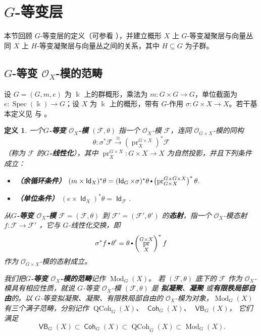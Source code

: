 \documentclass[11pt,a4paper]{article}
\renewcommand{\emph}[1]{{\bfseries #1}}
\DeclareMathOperator{\id}{\mathsf{Id}}
\DeclareMathOperator{\QCoh}{\mathrm{QCoh}}
\DeclareMathOperator{\Spec}{\mathrm{Spec}}
\DeclareMathOperator{\Mod}{\mathrm{Mod}}
\DeclareMathOperator{\Coh}{\mathsf{Coh}}
\DeclareMathOperator{\field}{\mathbb{k}}
\DeclareMathOperator{\VB}{\mathsf{VB}}
\DeclareMathOperator{\pr}{\operatorname{pr}}
\DeclareMathOperator{\comp}{\vcenter{\hbox{\scalebox{0.65}{$\bullet$}}}}
\theoremstyle{cnth}
\newtheorem{defn}[thm]{定义}
\begin{document}
\section{$G$-等变层\label{sec:G-equiv-sheaves}}
本节回顾 $G$-等变层的定义（可参看 \cite[\href{https://stacks.math.columbia.edu/tag/03LE}{Tag 03LE}]{stacks-project}），并建立概形 $X$ 上 $G$-等变凝聚层与向量丛同 $X$ 上 $H$-等变凝聚层与向量丛之间的关系，其中 $H\subseteq G$ 为子群。

\subsection{$G$-等变 $\mathcal{O}_X$-模的范畴}

设 $G=(G, m, e)$ 为 $\field$ 上的群概形，乘法为 $m : G \times G \rightarrow G$，单位截面为 $e : \Spec(\field) \rightarrow G$；设 $X$ 为 $\field$ 上的概形，带有 $G$-作用 $\sigma : G \times X \rightarrow X$。若干基本定义见 \cite[\href{https://stacks.math.columbia.edu/tag/022R}{Section 022R}]{stacks-project} 与 \cite[\href{https://stacks.math.columbia.edu/tag/01II}{Section 01II}]{stacks-project}。

\begin{defn}\label{defn:EquivariantSheaves}
一个\emph{$G$-等变 $\mathcal{O}_X$-模}
$(\mathcal{F}, \theta)$
指一个 $\mathcal{O}_X$-模 $\mathcal{F}$，连同 $\mathcal{O}_{G\times X}$-模的同构
$$
\theta : \sigma^* \mathcal{F} \xrightarrow{\cong} \left(\pr_X^{G \times X}\right)^* \mathcal{F}
$$
（称为 $\mathcal{F}$ 的\emph{$G$-线性化}），其中 $\pr_X^{G \times X} : G \times X \rightarrow X$ 为自然投影，并且下列条件成立：
\begin{itemize}
\item \emph{（余循环条件）}
$
(m \times \id_X)^* \theta
=
(\id_G \times \sigma)^* \theta \comp \left(\pr_{G \times X}^{G \times G \times X}\right)^* \theta.
$

\item \emph{（单位条件）}
$(e \times \id_X)^*\theta = \id_{\mathcal{F}}$.
\end{itemize}

从\emph{$G$-等变 $\mathcal{O}_X$-模}
$\mathcal{F}=(\mathcal{F}, \theta)$
到
$\mathcal{F}'=(\mathcal{F}', \theta')$
的\emph{态射}，指一个 $\mathcal{O}_X$-模态射
$
f : \mathcal{F} \rightarrow \mathcal{F}'
$
，它与 $G$-线性化交换，即
$$
\sigma^* f \comp \theta'
=
\theta \comp \left(\pr_X^{G \times X}\right)^* f
$$
作为 $\mathcal{O}_{G \times X}$-模的态射成立。

我们把\emph{$G$-等变 $\mathcal{O}_X$-模的范畴}记作
$\Mod_G(X)$。
若 $(\mathcal{F},\theta)$ 底下的 $\mathcal{F}$ 作为 $\mathcal{O}_X$-模具有相应性质，就说 $G$-等变 $\mathcal{O}_X$-模 $(\mathcal{F},\theta)$ 是
\emph{拟凝聚}、\emph{凝聚}
或\emph{有限秩局部自由}的。以 $G$-等变拟凝聚、凝聚、有限秩局部自由的 $\mathcal{O}_X$-模为对象，$\Mod_G(X)$ 有三个满子范畴，分别记作
$\QCoh_G(X)$、
$\Coh_G(X)$、
$\VB_G(X)$，
它们满足
$$
\VB_G(X)\subset\Coh_G(X)\subset\QCoh_G(X)\subset\Mod_G(X).
$$
\end{defn}
\end{document}
